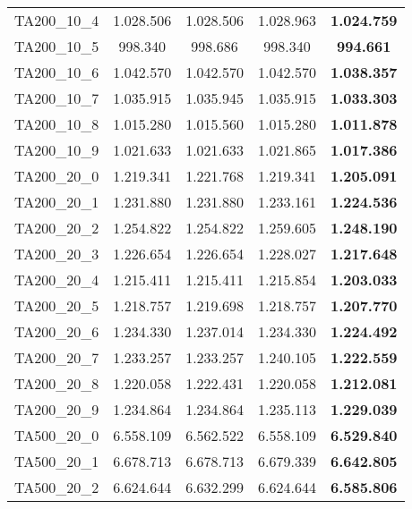 \begin{tabular}{cc|cc|c}
TA200\_10\_4       & 1.028.506        & 1.028.506        & 1.028.963        & {\bf 1.024.759} \\ 
TA200\_10\_5       & 998.340          & 998.686          & 998.340          & {\bf 994.661}   \\ 
TA200\_10\_6       & 1.042.570        & 1.042.570        & 1.042.570        & {\bf 1.038.357} \\ 
TA200\_10\_7       & 1.035.915        & 1.035.945        & 1.035.915        & {\bf 1.033.303} \\ 
TA200\_10\_8       & 1.015.280        & 1.015.560        & 1.015.280        & {\bf 1.011.878} \\ 
TA200\_10\_9       & 1.021.633        & 1.021.633        & 1.021.865        & {\bf 1.017.386} \\ 
TA200\_20\_0       & 1.219.341        & 1.221.768        & 1.219.341        & {\bf 1.205.091} \\ 
TA200\_20\_1       & 1.231.880        & 1.231.880        & 1.233.161        & {\bf 1.224.536} \\ 
TA200\_20\_2       & 1.254.822        & 1.254.822        & 1.259.605        & {\bf 1.248.190} \\ 
TA200\_20\_3       & 1.226.654        & 1.226.654        & 1.228.027        & {\bf 1.217.648} \\ 
TA200\_20\_4       & 1.215.411        & 1.215.411        & 1.215.854        & {\bf 1.203.033} \\ 
TA200\_20\_5       & 1.218.757        & 1.219.698        & 1.218.757        & {\bf 1.207.770} \\ 
TA200\_20\_6       & 1.234.330        & 1.237.014        & 1.234.330        & {\bf 1.224.492} \\ 
TA200\_20\_7       & 1.233.257        & 1.233.257        & 1.240.105        & {\bf 1.222.559} \\ 
TA200\_20\_8       & 1.220.058        & 1.222.431        & 1.220.058        & {\bf 1.212.081} \\ 
TA200\_20\_9       & 1.234.864        & 1.234.864        & 1.235.113        & {\bf 1.229.039} \\ 
TA500\_20\_0       & 6.558.109        & 6.562.522        & 6.558.109        & {\bf 6.529.840} \\ 
TA500\_20\_1       & 6.678.713        & 6.678.713        & 6.679.339        & {\bf 6.642.805} \\ 
TA500\_20\_2       & 6.624.644        & 6.632.299        & 6.624.644        & {\bf 6.585.806} \\ 

\end{tabular}
